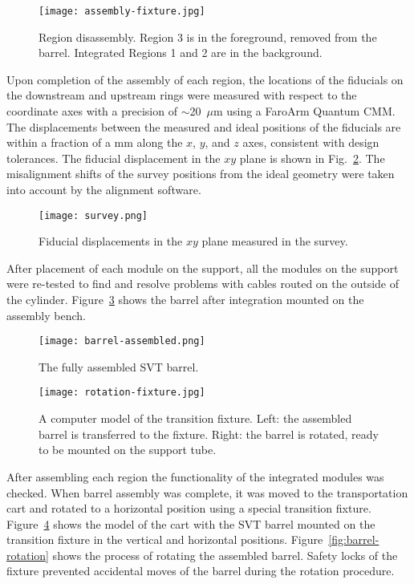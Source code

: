 \begin{figure}[h] 
\centering 
\texttt{[image: assembly-fixture.jpg]}
\caption{Region disassembly. Region 3 is in the foreground, removed from the barrel. Integrated Regions 1 and 2 are in the background.}
\label{fig:assembly-fixture}
\end{figure}

Upon completion of the assembly of each region, the locations of the fiducials on the downstream and upstream rings were measured with respect to the coordinate axes with a precision of $\sim$20~$\mu$m using a FaroArm Quantum CMM. The displacements between the measured and ideal positions of the fiducials are within a fraction of a mm along the $x$, $y$, and $z$ axes, consistent with design tolerances. The fiducial displacement in the $xy$ plane is shown in Fig.~\ref{fig:survey}. The misalignment shifts of the survey positions from the ideal geometry were taken into account by the alignment software. 

\begin{figure}[h]
\centering 
\texttt{[image: survey.png]}
\caption{Fiducial displacements in the $xy$ plane measured in the survey.}
\label{fig:survey}
\end{figure}

After placement of each module on the support, all the modules on the support were re-tested to find and resolve problems with cables routed on the outside of the cylinder. Figure~\ref{fig:barrel-assembled} shows the barrel after integration mounted on the assembly bench.


\begin{figure}[h] 
\centering 
\texttt{[image: barrel-assembled.png]}
\caption{The fully assembled SVT barrel.}
\label{fig:barrel-assembled}
\end{figure}

\begin{figure}[h] 
\centering 
\texttt{[image: rotation-fixture.jpg]}
\caption{A computer model of the transition fixture. Left: the assembled barrel is transferred to the fixture. Right: the barrel is rotated, ready to be mounted on the support tube.}
\label{fig:rotation-fixture}
\end{figure}

After assembling each region the functionality of the integrated modules was checked. When barrel assembly was complete, it was moved to the transportation cart and rotated to a horizontal position using a special transition fixture. Figure~\ref{fig:rotation-fixture} shows the model of the cart with the SVT barrel mounted on the transition fixture in the vertical and horizontal positions. Figure~\ref{fig:barrel-rotation} shows the process of rotating the assembled barrel. Safety locks of the fixture prevented accidental moves of the barrel during the rotation procedure.


